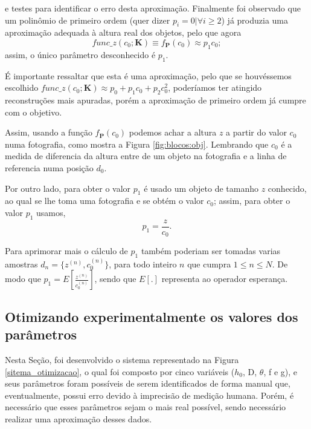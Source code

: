 \documentclass[a4paper, 12pt]{article}
\begin{document}
e testes para identificar o erro desta aproximação. Finalmente foi observado
que um polinômio de primeiro ordem (quer dizer $p_i=0|\forall i\geq 2$) 
já produzia uma aproximação adequada à altura real dos objetos,
pelo que agora  
\begin{equation}
func\_z(c_0;\mathbf{K})\equiv f_{\mathbf{P}}(c_0)\approx p_1 c_0;
\end{equation}
assim, o único parâmetro desconhecido é $p_1$.
\begin{remark}
É importante ressaltar que esta é uma aproximação,
pelo que se houvéssemos escolhido
$func\_z(c_0;\mathbf{K}) \approx p_0 + p_1 c_0+p_2 c_0^2$,
poderíamos ter atingido reconstruções mais apuradas,
porém a aproximação de primeiro ordem já cumpre com o objetivo.
\end{remark}

Assim, usando a função $f_{\mathbf{P}}(c_0)$ podemos achar a altura $z$
a partir do valor $c_0$ numa fotografia, como mostra a Figura \ref{fig:blocos:obj}.
Lembrando que $c_0$ é a medida de diferencia da altura entre de um objeto na fotografia
e a linha de referencia numa posição $d_0$.


Por outro lado, para obter o valor $p_1$ é usado um objeto de tamanho $z$ conhecido,
ao qual se lhe toma uma fotografia e se obtém o valor $c_0$;
assim, para obter o valor $p_1$ usamos,
\begin{equation}
p_1=\frac{z}{c_0}.
\end{equation}
\begin{remark}
Para aprimorar mais o cálculo de $p_1$ também poderiam ser tomadas varias amostras
$d_n=\{z^{(n)},c_0^{(n)}\}$, para todo inteiro $n$ que cumpra $1\leq n \leq N$.
De modo que $p_1=E\left[\frac{z^{(n)}}{c_0^{(n)}}\right]$, 
sendo que $E[.]$ representa ao operador esperança.
\end{remark}


\subsection{Otimizando experimentalmente os valores dos parâmetros}
\label{subsec:otimizandopar}
Nesta Seção, foi desenvolvido o sistema representado na Figura \ref{sitema_otimizacao}, o qual foi composto por cinco variáveis ($h_0$, D, $\theta$, f e g), e seus parâmetros foram possíveis de serem identificados de forma manual que, eventualmente, possui erro devido à imprecisão de medição humana. Porém, é necessário que esses parâmetros sejam o mais real possível, sendo necessário realizar uma aproximação desses dados.
\end{document}
